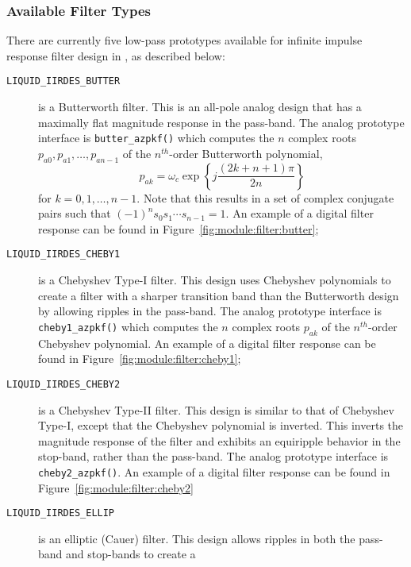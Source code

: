 \subsubsection{Available Filter Types}
\label{module:filter:iirdes:types}
There are currently five low-pass prototypes available for infinite impulse
response filter design in \liquid, as described below:
%
\begin{description}
\item[{\tt LIQUID\_IIRDES\_BUTTER}]
    is a Butterworth filter.
    This is an all-pole analog design that has a maximally flat magnitude
    response in the pass-band.
    The analog prototype interface is {\tt butter\_azpkf()} which
    computes the $n$ complex roots $p_{a0},p_{a1},\ldots,p_{an-1}$
    of the $n^{th}$-order Butterworth polynomial,
    \begin{equation}
    \label{eqn:filter:iirdes:butter}
        p_{ak} =
            \omega_c \exp\left\{
                j \frac{\left(2k+n+1\right)\pi}{2n}
            \right\}
    \end{equation}
    for $k=0,1,\ldots,n-1$.
    Note that this results in a set of complex conjugate pairs such that
    $(-1)^n s_0 s_1 \cdots s_{n-1} = 1$.
    An example of a digital filter response can be found in
    Figure~\ref{fig:module:filter:butter};
\item[{\tt LIQUID\_IIRDES\_CHEBY1}]
    is a Chebyshev Type-I filter.
    This design uses Chebyshev polynomials to create a filter with a sharper
    transition band than the Butterworth design by allowing ripples in the
    pass-band.
    The analog prototype interface is {\tt cheby1\_azpkf()} which
    computes the $n$ complex roots $p_{ak}$ of the $n^{th}$-order
    Chebyshev polynomial.
    An example of a digital filter response can be found in
    Figure~\ref{fig:module:filter:cheby1};
\item[{\tt LIQUID\_IIRDES\_CHEBY2}]
    is a Chebyshev Type-II filter.
    This design is similar to that of Chebyshev Type-I, except that the
    Chebyshev polynomial is inverted.
    This inverts the magnitude response of the filter and exhibits an
    equiripple behavior in the stop-band, rather than the pass-band.
    The analog prototype interface is {\tt cheby2\_azpkf()}.
    An example of a digital filter response can be found in
    Figure~\ref{fig:module:filter:cheby2}
\item[{\tt LIQUID\_IIRDES\_ELLIP}]
    is an elliptic (Cauer) filter.
    This design allows ripples in both the pass-band and stop-bands to create a

\end{description}
